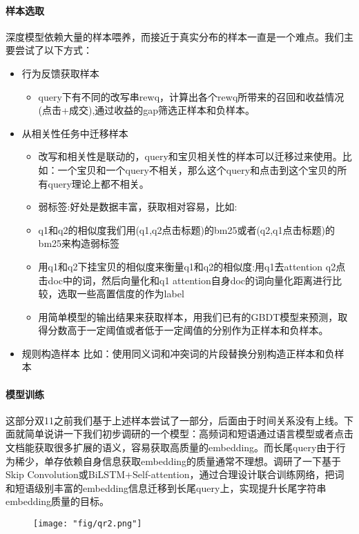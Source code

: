 \paragraph{样本选取}
深度模型依赖大量的样本喂养，而接近于真实分布的样本一直是一个难点。我们主要尝试了以下方式：
\begin{itemize}
\item 行为反馈获取样本
\begin{itemize}
\item query下有不同的改写串rewq，计算出各个rewq所带来的召回和收益情况(点击+成交),通过收益的gap筛选正样本和负样本。
\end{itemize}
\item 从相关性任务中迁移样本
\begin{itemize}
\item 改写和相关性是联动的，query和宝贝相关性的样本可以迁移过来使用。比如：一个宝贝和一个query不相关，那么这个query和点击到这个宝贝的所有query理论上都不相关。
\item 弱标签:好处是数据丰富，获取相对容易，比如:
\end{itemize}
\begin{itemize}
\item q1和q2的相似度我们用(q1,q2点击标题)的bm25或者(q2,q1点击标题)的bm25来构造弱标签
\item 用q1和{q2下挂宝贝}的相似度来衡量q1和q2的相似度:用q1去attention q2点击doc中的词，然后向量化和q1 attention自身doc的词向量化距离进行比较，选取一些高置信度的作为label
\item 用简单模型的输出结果来获取样本，用我们已有的GBDT模型来预测，取得分数高于一定阈值或者低于一定阈值的分别作为正样本和负样本。
\end{itemize}
\item 规则构造样本
比如：使用同义词和冲突词的片段替换分别构造正样本和负样本
\end{itemize}

\paragraph{模型训练}
这部分双11之前我们基于上述样本尝试了一部分，后面由于时间关系没有上线。下面就简单说讲一下我们初步调研的一个模型：高频词和短语通过语言模型或者点击文档能获取很多扩展的语义，容易获取高质量的embedding。而长尾query由于行为稀少，单存依赖自身信息获取embedding的质量通常不理想。调研了一下基于Skip Convolution或BiLSTM+Self-attention，通过合理设计联合训练网络，把词和短语级别丰富的embedding信息迁移到长尾query上，实现提升长尾字符串embedding质量的目标。
\begin{figure}[!h]
	\centering
	\texttt{[image: "fig/qr2.png"]}
	\caption{}
	\label{fig:qr2}
\end{figure}

